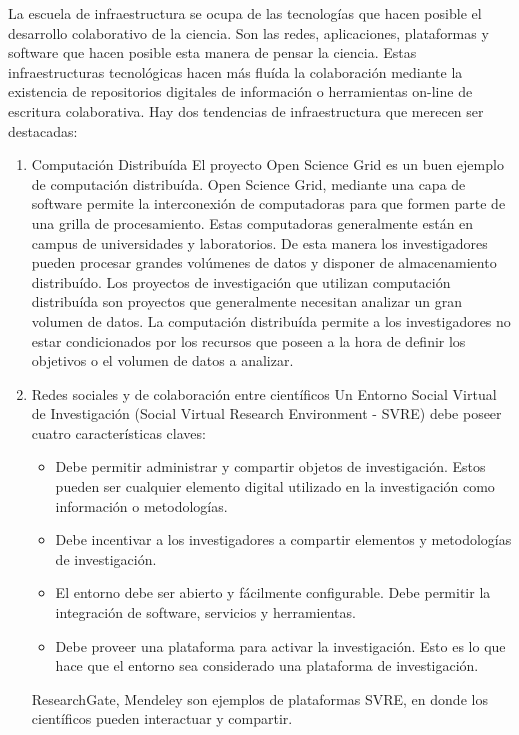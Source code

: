 		La escuela de infraestructura se ocupa de las tecnologías que hacen posible el desarrollo colaborativo de la ciencia. Son las redes, aplicaciones, plataformas y software que hacen posible esta manera de pensar la ciencia. Estas infraestructuras tecnológicas hacen más fluída la colaboración mediante la existencia de repositorios digitales de información o herramientas on-line de escritura colaborativa. Hay dos tendencias de infraestructura que merecen ser destacadas:
		\begin{enumerate}
			\item {Computación Distribuída}
			El proyecto Open Science Grid es un buen ejemplo de computación distribuída. Open Science Grid, mediante una capa de software permite la interconexión de computadoras para que  formen parte de una grilla de procesamiento. Estas computadoras generalmente están en campus de universidades y laboratorios. De esta manera los investigadores pueden procesar grandes volúmenes de datos y disponer de almacenamiento distribuído. Los proyectos de investigación que utilizan computación distribuída son proyectos que generalmente necesitan analizar un gran volumen de datos. La computación distribuída permite a los investigadores no estar condicionados por los recursos que poseen a la hora de definir los objetivos o el volumen de datos a analizar.
			\item {Redes sociales y de colaboración entre científicos}
			Un Entorno Social Virtual de Investigación (Social Virtual Research Environment - SVRE) debe poseer cuatro características claves:
			\begin{itemize}
				\item Debe permitir administrar y compartir objetos de investigación. Estos pueden ser cualquier elemento digital utilizado en la investigación como información o metodologías.
				\item Debe incentivar a los investigadores a compartir elementos y metodologías de investigación.
				\item El entorno debe ser abierto y fácilmente configurable. Debe permitir la integración de software, servicios y herramientas.
				\item Debe proveer una plataforma para activar la investigación. Esto es lo que hace que el entorno sea considerado una plataforma de investigación.				
			\end{itemize}	
			ResearchGate, Mendeley son ejemplos de plataformas SVRE, en donde los científicos pueden interactuar y compartir.
		\end{enumerate}
		
